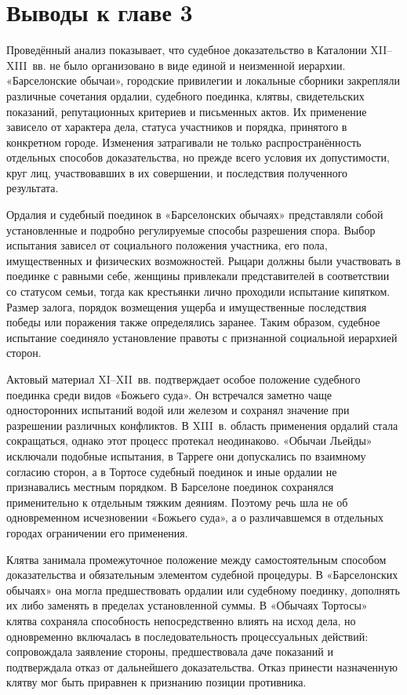 \section*{Выводы к главе 3}

Проведённый анализ показывает, что судебное доказательство в Каталонии XII--XIII~вв. не было организовано в виде единой и неизменной иерархии. «Барселонские обычаи», городские привилегии и локальные сборники закрепляли различные сочетания ордалии, судебного поединка, клятвы, свидетельских показаний, репутационных критериев и письменных актов. Их применение зависело от характера дела, статуса участников и порядка, принятого в конкретном городе. Изменения затрагивали не только распространённость отдельных способов доказательства, но прежде всего условия их допустимости, круг лиц, участвовавших в их совершении, и последствия полученного результата.

Ордалия и судебный поединок в «Барселонских обычаях» представляли собой установленные и подробно регулируемые способы разрешения спора. Выбор испытания зависел от социального положения участника, его пола, имущественных и физических возможностей. Рыцари должны были участвовать в поединке с равными себе, женщины привлекали представителей в соответствии со статусом семьи, тогда как крестьянки лично проходили испытание кипятком. Размер залога, порядок возмещения ущерба и имущественные последствия победы или поражения также определялись заранее. Таким образом, судебное испытание соединяло установление правоты с признанной социальной иерархией сторон.

Актовый материал XI--XII~вв. подтверждает особое положение судебного поединка среди видов «Божьего суда». Он встречался заметно чаще односторонних испытаний водой или железом и сохранял значение при разрешении различных конфликтов. В XIII~в. область применения ордалий стала сокращаться, однако этот процесс протекал неодинаково. «Обычаи Льейды» исключали подобные испытания, в Тарреге они допускались по взаимному согласию сторон, а в Тортосе судебный поединок и иные ордалии не признавались местным порядком. В Барселоне поединок сохранялся применительно к отдельным тяжким деяниям. Поэтому речь шла не об одновременном исчезновении «Божьего суда», а о различавшемся в отдельных городах ограничении его применения.

Клятва занимала промежуточное положение между самостоятельным способом доказательства и обязательным элементом судебной процедуры. В «Барселонских обычаях» она могла предшествовать ордалии или судебному поединку, дополнять их либо заменять в пределах установленной суммы. В «Обычаях Тортосы» клятва сохраняла способность непосредственно влиять на исход дела, но одновременно включалась в последовательность процессуальных действий: сопровождала заявление стороны, предшествовала даче показаний и подтверждала отказ от дальнейшего доказательства. Отказ принести назначенную клятву мог быть приравнен к признанию позиции противника.

